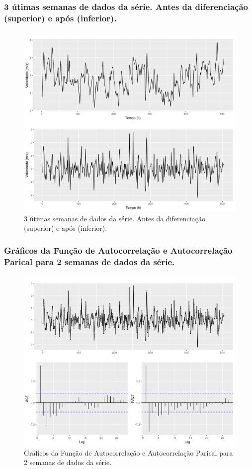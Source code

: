 \documentclass{beamer}
\begin{document}
\begin{frame}
	\frametitle{3 útimas semanas de dados da série. Antes da diferenciação (superior) e após (inferior).}
	\begin{figure}
		\centering
		\includegraphics[width=\textwidth]{last3weeks.png}
		\caption{3 útimas semanas de dados da série. Antes da diferenciação (superior) e após (inferior).}
	\end{figure}
\end{frame}

\begin{frame}
	\frametitle{Gráficos da Função de Autocorrelação e Autocorrelação Parical para 2 semanas de dados da série.}
	\begin{figure}
		\centering
		\includegraphics[width=\textwidth]{last3weeks_acf.png}
		\caption{Gráficos da Função de Autocorrelação e Autocorrelação Parical para 2 semanas de dados da série.}
	\end{figure}
\end{frame}
\end{document}
